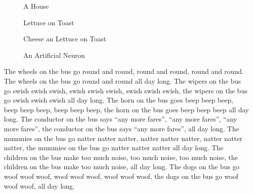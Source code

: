 \documentclass[a4paper]{article}
\begin{document}
\begin{figure}[htbp]
\centerline{}
\caption{A House}
\end{figure}

\begin{figure}[htbp]
\centerline{}
\caption{Lettuce on Toast}
\end{figure}

\begin{figure}[htbp]
\centerline{}
\caption{Cheese an Lettuce on Toast}
\end{figure}

\begin{figure}[htbp]
\centerline{}
\caption{An Artificial Neuron}
\end{figure}

\clearpage

The wheels on the bus go round and round, round and round,
round and round. The wheels on the bus go round and round
all day long. The wipers on the bus go swish swish swish,
swish swish swish, swish swish swish, the wipers on the bus
go swish swish swish all day long. The horn on the bus goes
beep beep beep, beep beep beep, beep beep beep, the horn on
the bus goes beep beep beep all day long. The conductor on 
the bus says ``any more fares'', ``any more fares'', ``any 
more fares'', the conductor on the bus says ``any more 
fares'', all day long. The mummies on the 
bus go natter natter natter, natter natter natter, natter 
natter natter, the mummies on the bus go natter natter 
natter all day long. The children on the bus make too much
noise, too much noise, too much noise, the children on the
bus make too much noise, all day long. The dogs on the bus 
go woof woof woof, woof woof woof, woof woof woof, the dogs 
on the bus go woof woof woof, all day long.
\end{document}
